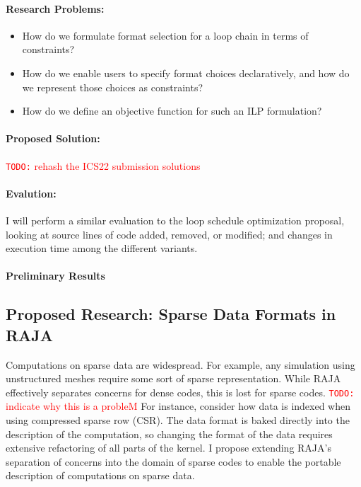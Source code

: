 \documentclass{article}
\newcommand{\todo}[1]{{\textcolor{red}{{\tt{TODO:}}\,\,#1 }}}
\begin{document}
\paragraph{Research Problems:}

\begin{itemize}
\item How do we formulate format selection for a loop chain in terms of constraints?
\item How do we enable users to specify format choices declaratively, and how do we represent those choices as constraints?
\item How do we define an objective function for such an ILP formulation?
\end{itemize}

\paragraph{Proposed Solution:}

\todo{rehash the ICS22 submission solutions}

\paragraph{Evalution:}

I will perform a similar evaluation to the loop schedule optimization proposal, looking at source lines of code added, removed, or modified; and changes in execution time among the different variants.

\paragraph{Preliminary Results}


\subsection{Proposed Research: Sparse Data Formats in RAJA}

Computations on sparse data are widespread. 
For example, any simulation using unstructured meshes require some sort of sparse representation.
While RAJA effectively separates concerns for dense codes, this is lost for sparse codes.
\todo{indicate why this is a probleM}
For instance, consider how data is indexed when using compressed sparse row (CSR). 
The data format is baked directly into the description of the computation, so changing the format of the data requires extensive refactoring of all parts of the kernel.
I propose extending RAJA's separation of concerns into the domain of sparse codes to enable the portable description of computations on sparse data.
\end{document}
